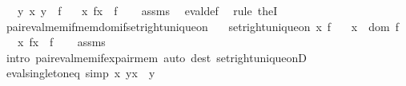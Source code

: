 \begin{isabellebody}
\ \ \ {\isachardoublequoteopen}{\isasymexists}{\isacharbang}{\kern0pt}y{\isachardot}{\kern0pt}\ {\isasymlangle}x{\isacharcomma}{\kern0pt}\ y{\isasymrangle}\ {\isasymin}\ f{\isachardoublequoteclose}\isanewline
\ \ \ {\isachardoublequoteopen}{\isasymlangle}x{\isacharcomma}{\kern0pt}\ f{\isacharbackquote}{\kern0pt}x{\isasymrangle}\ {\isasymin}\ f{\isachardoublequoteclose}\isanewline
%
\isadelimproof
\ \ %
\endisadelimproof
%
\isatagproof
{}\isamarkupfalse%
\ assms\ \isamarkupfalse%
\ eval{\isacharunderscore}{\kern0pt}def\ \isamarkupfalse%
\ {\isacharparenleft}{\kern0pt}rule\ theI{\isacharprime}{\kern0pt}{\isacharparenright}{\kern0pt}%
\endisatagproof
{\isafoldproof}%
%
\isadelimproof
\isanewline
%
\endisadelimproof
\isanewline
{}\isamarkupfalse%
\ pair{\isacharunderscore}{\kern0pt}eval{\isacharunderscore}{\kern0pt}mem{\isacharunderscore}{\kern0pt}if{\isacharunderscore}{\kern0pt}mem{\isacharunderscore}{\kern0pt}dom{\isacharunderscore}{\kern0pt}if{\isacharunderscore}{\kern0pt}set{\isacharunderscore}{\kern0pt}right{\isacharunderscore}{\kern0pt}unique{\isacharunderscore}{\kern0pt}on{\isacharcolon}{\kern0pt}\isanewline
\ \ \ {\isachardoublequoteopen}set{\isacharunderscore}{\kern0pt}right{\isacharunderscore}{\kern0pt}unique{\isacharunderscore}{\kern0pt}on\ {\isacharbraceleft}{\kern0pt}x{\isacharbraceright}{\kern0pt}\ f{\isachardoublequoteclose}\isanewline
\ \ \ {\isachardoublequoteopen}x\ {\isasymin}\ dom\ f{\isachardoublequoteclose}\isanewline
\ \ \ {\isachardoublequoteopen}{\isasymlangle}x{\isacharcomma}{\kern0pt}\ f{\isacharbackquote}{\kern0pt}x{\isasymrangle}\ {\isasymin}\ f{\isachardoublequoteclose}\isanewline
%
\isadelimproof
\ \ %
\endisadelimproof
%
\isatagproof
{}\isamarkupfalse%
\ assms\isanewline
\ \ \isamarkupfalse%
\ {\isacharparenleft}{\kern0pt}intro\ pair{\isacharunderscore}{\kern0pt}eval{\isacharunderscore}{\kern0pt}mem{\isacharunderscore}{\kern0pt}if{\isacharunderscore}{\kern0pt}ex{}{\isacharunderscore}{\kern0pt}pair{\isacharunderscore}{\kern0pt}mem{\isacharparenright}{\kern0pt}\ {\isacharparenleft}{\kern0pt}auto\ dest{\isacharcolon}{\kern0pt}\ set{\isacharunderscore}{\kern0pt}right{\isacharunderscore}{\kern0pt}unique{\isacharunderscore}{\kern0pt}onD{\isacharparenright}{\kern0pt}%
\endisatagproof
{\isafoldproof}%
%
\isadelimproof
\isanewline
%
\endisadelimproof
\isanewline
{}\isamarkupfalse%
\ eval{\isacharunderscore}{\kern0pt}singleton{\isacharunderscore}{\kern0pt}eq\ {\isacharbrackleft}{\kern0pt}simp{\isacharbrackright}{\kern0pt}{\isacharcolon}{\kern0pt}\ {\isachardoublequoteopen}{\isacharbraceleft}{\kern0pt}{\isasymlangle}x{\isacharcomma}{\kern0pt}\ y{\isasymrangle}{\isacharbraceright}{\kern0pt}{\isacharbackquote}{\kern0pt}x\ {\isacharequal}{\kern0pt}\ y{\isachardoublequoteclose}\isanewline

\end{isabellebody}
